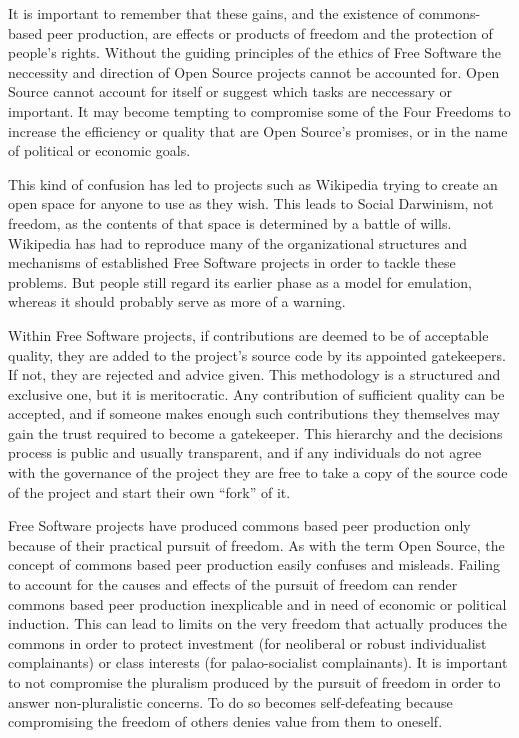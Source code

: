 \documentclass[11pt, a4]{article}
\begin{document}
It is important to remember that these gains, and the existence of commons-based peer production, are effects or products of freedom and the protection of people's rights. Without the guiding principles of the ethics of Free Software the neccessity and direction of Open Source projects cannot be accounted for. Open Source cannot account for itself or suggest which tasks are neccessary or important. It may become tempting to compromise some of the Four Freedoms to increase the efficiency or quality that are Open Source's promises, or in the name of political or economic goals.

This kind of confusion has led to projects such as Wikipedia trying to create an open space for anyone to use as they wish. This leads to Social Darwinism, not freedom, as the contents of that space is determined by a battle of wills. Wikipedia has had to reproduce many of the organizational structures and mechanisms of established Free Software projects in order to tackle these problems. But people still regard its earlier phase as a model for emulation, whereas it should probably serve as more of a warning.

Within Free Software projects, if contributions are deemed to be of acceptable quality, they are added to the project's source code by its appointed gatekeepers. If not, they are rejected and advice given. This methodology is a structured and exclusive one, but it is meritocratic. Any contribution of sufficient quality can be accepted, and if someone makes enough such contributions they themselves may gain the trust required to become a gatekeeper. This hierarchy and the decisions process is public and usually transparent, and if any individuals do not agree with the governance of the project they are free to take a copy of the source code of the project and start their own ``fork'' of it.

Free Software projects have produced commons based peer production only because of their practical pursuit of freedom. As with the term Open Source, the concept of commons based peer production easily confuses and misleads. Failing to account for the causes and effects of the pursuit of freedom can render commons based peer production inexplicable and in need of economic or political induction. This can lead to limits on the very freedom that actually produces the commons in order to protect investment (for neoliberal or robust individualist complainants) or class interests (for palao-socialist complainants). It is important to not compromise the pluralism produced by the pursuit of freedom in order to answer non-pluralistic concerns. To do so becomes self-defeating because compromising the freedom of others denies value from them to oneself.
\end{document}
